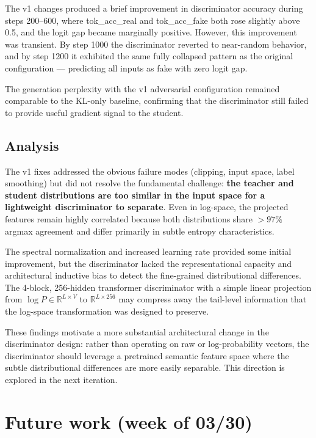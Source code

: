 \documentclass{article}
\begin{document}
The v1 changes produced a brief improvement in discriminator accuracy during steps 200--600, where tok\_acc\_real and tok\_acc\_fake both rose slightly above 0.5, and the logit gap became marginally positive. However, this improvement was transient. By step 1000 the discriminator reverted to near-random behavior, and by step 1200 it exhibited the same fully collapsed pattern as the original configuration --- predicting all inputs as fake with zero logit gap.

The generation perplexity with the v1 adversarial configuration remained comparable to the KL-only baseline, confirming that the discriminator still failed to provide useful gradient signal to the student.

\subsection{Analysis}

The v1 fixes addressed the obvious failure modes (clipping, input space, label smoothing) but did not resolve the fundamental challenge: \textbf{the teacher and student distributions are too similar in the input space for a lightweight discriminator to separate}. Even in log-space, the projected features remain highly correlated because both distributions share $> 97\%$ argmax agreement and differ primarily in subtle entropy characteristics.

The spectral normalization and increased learning rate provided some initial improvement, but the discriminator lacked the representational capacity and architectural inductive bias to detect the fine-grained distributional differences. The 4-block, 256-hidden transformer discriminator with a simple linear projection from $\log P \in \mathbb{R}^{L \times V}$ to $\mathbb{R}^{L \times 256}$ may compress away the tail-level information that the log-space transformation was designed to preserve.

These findings motivate a more substantial architectural change in the discriminator design: rather than operating on raw or log-probability vectors, the discriminator should leverage a pretrained semantic feature space where the subtle distributional differences are more easily separable. This direction is explored in the next iteration.

\section{Future work (week of 03/30)}
\end{document}
